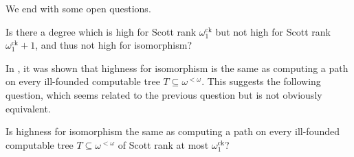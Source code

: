 \documentclass{amsart}
\newcommand\+[1]{\mathcal{#1}}
\renewcommand\*[1]{\mathbf{#1}}
\renewcommand\=[1]{\text{#1}}
\renewcommand\*[1]{\mathbf{#1}}
\newcommand{\ock}{\omega_{1}^{\mathrm{ck}}}
\begin{document}
We end with some open questions.

\begin{question}
Is there a degree which is high for Scott rank $\ock$ but not high for Scott rank $\ock+1$, and thus not high for isomorphism?
\end{question}

In \cite{cft23}, it was shown that highness for isomorphism is the same as computing a path on every ill-founded computable tree $T \subseteq \omega^{<\omega}$.  This suggests the following question, which seems related to the previous question but is not obviously equivalent.

\begin{question}
Is highness for isomorphism the same as computing a path on every ill-founded computable tree $T \subseteq \omega^{<\omega}$ of Scott rank at most $\ock$?
\end{question}


\printbibliography
\end{document}
